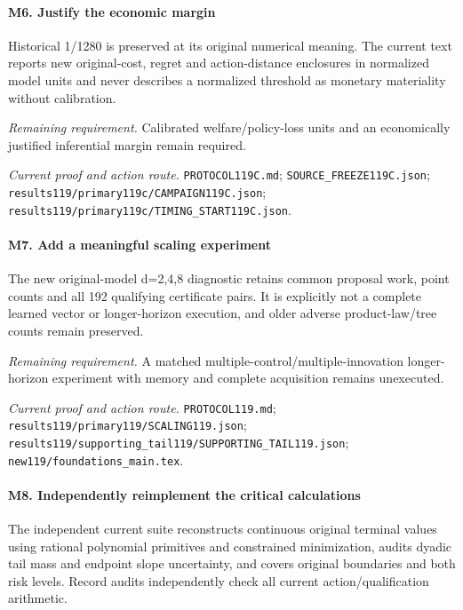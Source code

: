 \paragraph{M6. Justify the economic margin}

Historical 1/1280 is preserved at its original numerical meaning. The current text reports new original-cost, regret and action-distance enclosures in normalized model units and never describes a normalized threshold as monetary materiality without calibration.

\par\emph{Remaining requirement.} Calibrated welfare/\allowbreak{}policy-loss units and an economically justified inferential margin remain required.

\par\emph{Current proof and action route.} \nolinkurl{PROTOCOL119C.md}; \nolinkurl{SOURCE_FREEZE119C.json}; \nolinkurl{results119/primary119c/CAMPAIGN119C.json}; \nolinkurl{results119/primary119c/TIMING_START119C.json}.

\paragraph{M7. Add a meaningful scaling experiment}

The new original-model d=2,4,8 diagnostic retains common proposal work, point counts and all 192 qualifying certificate pairs. It is explicitly not a complete learned vector or longer-horizon execution, and older adverse product-law/\allowbreak{}tree counts remain preserved.

\par\emph{Remaining requirement.} A matched multiple-control/\allowbreak{}multiple-innovation longer-horizon experiment with memory and complete acquisition remains unexecuted.

\par\emph{Current proof and action route.} \nolinkurl{PROTOCOL119.md}; \nolinkurl{results119/primary119/SCALING119.json}; \nolinkurl{results119/supporting_tail119/SUPPORTING_TAIL119.json}; \nolinkurl{new119/foundations_main.tex}.

\paragraph{M8. Independently reimplement the critical calculations}

The independent current suite reconstructs continuous original terminal values using rational polynomial primitives and constrained minimization, audits dyadic tail mass and endpoint slope uncertainty, and covers original boundaries and both risk levels. Record audits independently check all current action/\allowbreak{}qualification arithmetic.

